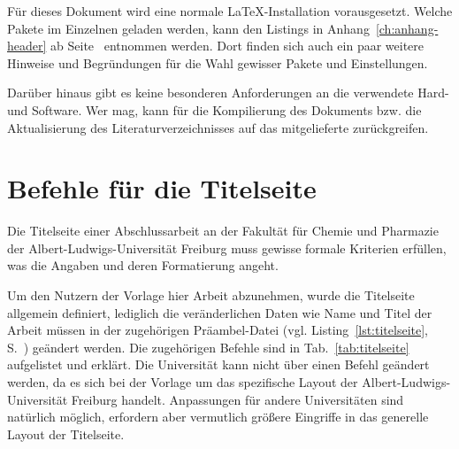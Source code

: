 Für dieses Dokument wird eine normale \LaTeX{}-Installation vorausgesetzt. Welche Pakete im Einzelnen geladen werden, kann den Listings in Anhang~\ref{ch:anhang-header} ab Seite~\pageref{ch:anhang-header} entnommen werden. Dort finden sich auch ein paar weitere Hinweise und Begründungen für die Wahl gewisser Pakete und Einstellungen.

Darüber hinaus gibt es keine besonderen Anforderungen an die verwendete Hard- und Software. Wer mag, kann für die Kompilierung des Dokuments bzw. die Aktualisierung des Literaturverzeichnisses auf das mitgelieferte  zurückgreifen.


\section{Befehle für die Titelseite}

Die Titelseite einer Abschlussarbeit an der Fakultät für Chemie und Pharmazie der Albert-Ludwigs-Universität Freiburg muss gewisse formale Kriterien erfüllen, was die Angaben und deren Formatierung angeht.

Um den Nutzern der Vorlage hier Arbeit abzunehmen, wurde die Titelseite allgemein definiert, lediglich die veränderlichen Daten wie Name und Titel der Arbeit müssen in der zugehörigen Präambel-Datei  (vgl. Listing~\ref{lst:titelseite}, S.~\pageref{lst:titelseite}) geändert werden. Die zugehörigen Befehle sind in Tab.~\ref{tab:titelseite} aufgelistet und erklärt. Die Universität kann nicht über einen Befehl geändert werden, da es sich bei der Vorlage um das spezifische Layout der Albert-Ludwigs-Universität Freiburg handelt. Anpassungen für andere Universitäten sind natürlich möglich, erfordern aber vermutlich größere Eingriffe in das generelle Layout der Titelseite.




